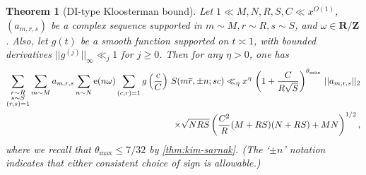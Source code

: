 \documentclass[reqno,11pt]{amsart}
\newtheorem{theorem}{Theorem}[section]
\theoremstyle{definition}
\theoremstyle{remark}
\numberwithin{equation}{section}
\newcommand{\Z}{\mathbf{Z}}
\newcommand{\R}{\mathbf{R}}
\newcommand{\e}{\textnormal{e}}
\renewcommand{\bar}{\overline}
\begin{document}
\begin{theorem}[DI-type Kloosterman bound] \label{thm:di-type-bound}
Let $1 \ll M, N, R, S, C \ll x^{O(1)}$, $(a_{m,r,s})$ be a complex sequence supported in $m \sim M, r \sim R, s \sim S$, and $\omega \in \R/\Z$. Also, let $g(t)$ be a smooth function supported on $t \asymp 1$, with bounded derivatives $||g^{(j)}||_\infty \ll_{j} 1$ for $j \ge 0$. Then for any $\eta > 0$, one has
\[
\begin{aligned}
    \sum_{\substack{r \sim R \\ s \sim S \\ (r, s) = 1}}
    \sum_{m \sim M} a_{m,r,s} \sum_{n \sim N} \e(n\omega)
    \sum_{(c, r) = 1} g\left(\frac{c}{C}\right)\, S(m\bar{r}, \pm n; sc)
    \ll_\eta 
    x^\eta\,
    \left(1 + \frac{C}{R\sqrt{S}}\right)^{\theta_{\max}}\, 
    ||a_{m,r,s}||_2
    \\
    \times 
    \sqrt{NRS}
    \left(\frac{C^2}{R} (M + RS)(N + RS) + MN \right)^{1/2},
\end{aligned}
\]
where we recall that $\theta_{\max} \le 7/32$ by \cref{thm:kim-sarnak}. (The `$\pm n$' notation indicates that either consistent choice of sign is allowable.)
\end{theorem}

\end{document}
